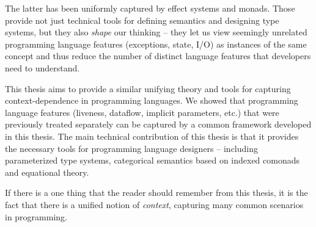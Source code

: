 The latter has been uniformly captured by effect systems and monads. Those provide not just
technical tools for defining semantics and designing type systems, but they also \emph{shape}
our thinking -- they let us view seemingly unrelated programming language features (exceptions,
state, I/O) as instances of the same concept and thus reduce the number of distinct language
features that developers need to understand.

This thesis aims to provide a similar unifying theory and tools for capturing context-dependence
in programming languages. We showed that programming language features (liveness, dataflow,
implicit parameters, etc.) that were previously treated separately can be captured by a common
framework developed in this thesis. The main technical contribution of this thesis is that it
provides the necessary tools for programming language designers -- including parameterized type
systems, categorical semantics based on indexed comonads and equational theory.

If there is a one thing that the reader should remember from this thesis, it is the fact that
there is a unified notion of \emph{context}, capturing many common scenarios in programming.
